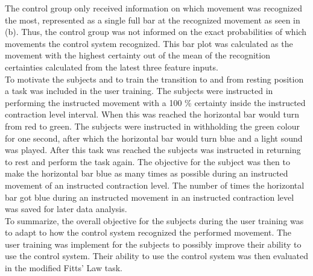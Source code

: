 The control group only received information on which movement was recognized the most, represented as a single full bar at the recognized movement as seen in  (b). Thus, the control group was not informed on the exact probabilities of which movements the control system recognized. This bar plot was calculated as the movement with the highest certainty out of the mean of the recognition certainties calculated from the latest three feature inputs. \\
To motivate the subjects and to train the transition to and from resting position a task was included in the user training. The subjects were instructed in performing the instructed movement with a 100 \% certainty inside the instructed contraction level interval. When this was reached the horizontal bar would turn from red to green. The subjects were instructed in withholding the green colour for one second, after which the horizontal bar would turn blue and a light sound was played. After this task was reached the subjects was instructed in returning to rest and perform the task again. The objective for the subject was then to make the horizontal bar blue as many times as possible during an instructed movement of an instructed contraction level. The number of times the horizontal bar got blue during an instructed movement in an instructed contraction level was saved for later data analysis. \\

To summarize, the overall objective for the subjects during the user training was to adapt to how the control system recognized the performed movement. The user training was implement for the subjects to possibly improve their ability to use the control system. Their ability to use the control system was then evaluated in the modified Fitts' Law task. 











 







